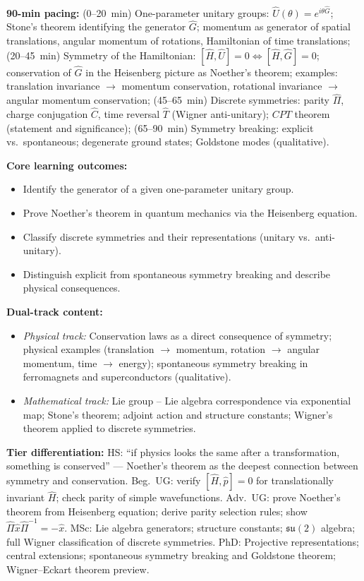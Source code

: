 \documentclass[11pt,a4paper]{article}
\begin{document}
\medskip
\begin{tcolorbox}[modulebox, title={Module~I.3 / L04: Infinitesimal Generators, Symmetries, and Noether's Theorem}]
\textbf{90-min pacing:} (0--20~min) One-parameter unitary groups:
$\hat{U}(\theta)=e^{i\theta\hat{G}}$; Stone's theorem identifying the
generator $\hat{G}$; momentum as generator of spatial translations,
angular momentum of rotations, Hamiltonian of time translations;
(20--45~min) Symmetry of the Hamiltonian: $[\hat{H},\hat{U}]=0
\Leftrightarrow[\hat{H},\hat{G}]=0$; conservation of $\hat{G}$
in the Heisenberg picture as Noether's theorem;
examples: translation invariance $\to$ momentum conservation,
rotational invariance $\to$ angular momentum conservation;
(45--65~min) Discrete symmetries: parity $\hat{\Pi}$, charge conjugation $\hat{C}$,
time reversal $\hat{T}$ (Wigner anti-unitary); $CPT$ theorem (statement and significance);
(65--90~min) Symmetry breaking: explicit vs.\ spontaneous;
degenerate ground states; Goldstone modes (qualitative).

\medskip\textbf{Core learning outcomes:}
\begin{itemize}[leftmargin=1.4em,topsep=2pt,itemsep=1pt]
  \item Identify the generator of a given one-parameter unitary group.
  \item Prove Noether's theorem in quantum mechanics via the Heisenberg equation.
  \item Classify discrete symmetries and their representations (unitary vs.\ anti-unitary).
  \item Distinguish explicit from spontaneous symmetry breaking and describe physical consequences.
\end{itemize}

\medskip\textbf{Dual-track content:}
\begin{itemize}[leftmargin=1.4em,topsep=2pt,itemsep=1pt]
  \item \textit{Physical track:} Conservation laws as a direct consequence of symmetry;
    physical examples (translation $\to$ momentum, rotation $\to$ angular momentum,
    time $\to$ energy); spontaneous symmetry breaking in ferromagnets and superconductors (qualitative).
  \item \textit{Mathematical track:} Lie group -- Lie algebra correspondence via exponential map;
    Stone's theorem; adjoint action and structure constants;
    Wigner's theorem applied to discrete symmetries.
\end{itemize}

\medskip\textbf{Tier differentiation:}
HS: ``if physics looks the same after a transformation, something is conserved'' ---
Noether's theorem as the deepest connection between symmetry and conservation.
Beg.\ UG: verify $[\hat{H},\hat{p}]=0$ for translationally invariant $\hat{H}$;
check parity of simple wavefunctions.
Adv.\ UG: prove Noether's theorem from Heisenberg equation;
derive parity selection rules; show $\hat{\Pi}\hat{x}\hat{\Pi}^{-1}=-\hat{x}$.
MSc: Lie algebra generators; structure constants; $\mathfrak{su}(2)$ algebra;
full Wigner classification of discrete symmetries.
PhD: Projective representations; central extensions; spontaneous symmetry breaking
and Goldstone theorem; Wigner--Eckart theorem preview.


\end{tcolorbox}
\end{document}
